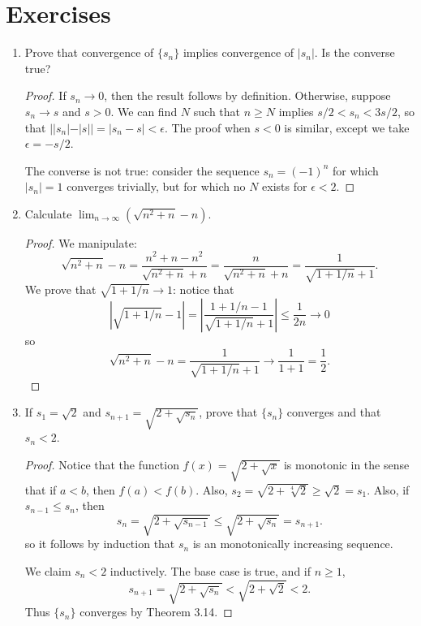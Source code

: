 \documentclass{scrbook}
\renewcommand{\to}{\rightarrow}
\begin{document}
\section{Exercises}

\begin{enumerate}
\item %
Prove that convergence of $\{s_n\}$ implies convergence of $|s_n|$. Is the converse true?

\begin{proof}
If $s_n \to 0$, then the result follows by definition. Otherwise, suppose $s_n \to s$ and $s > 0$. We can find $N$ such that $n \ge N$ implies $s/2 < s_n < 3s/2$, so that $||s_n| - |s|| = |s_n - s| < \epsilon$. The proof when $s < 0$ is similar, except we take $\epsilon = -s/2$.

The converse is not true: consider the sequence $s_n = (-1)^{n}$ for which $|s_n| = 1$ converges trivially, but for which no $N$ exists for $\epsilon < 2$.
\end{proof}

\item %
Calculate $\lim_{n \to \infty} (\sqrt{n^2 + n} - n)$.

\begin{proof}
We manipulate:
\[
	\sqrt{n^2 + n} - n = \frac{n^2 + n - n^2}{\sqrt{n^2 + n} + n} = \frac{n}{\sqrt{n^2 + n} + n} = \frac{1}{\sqrt{1 + 1/n} + 1}.
\]
We prove that $\sqrt{1+1/n} \to 1$: notice that
\[
	|\sqrt{1+1/n} - 1| = \left| \frac{1 + 1/n - 1}{\sqrt{1 + 1/n} + 1} \right| \le \frac{1}{2n} \to 0
\]
so 
\[
	\sqrt{n^2 + n} - n = \frac{1}{\sqrt{1 + 1/n} + 1} \to \frac{1}{1 + 1} = \frac{1}{2}.
\]
\end{proof}

\item %
If $s_1 = \sqrt{2}$ and $s_{n+1} = \sqrt{2 + \sqrt{s_n}}$, prove that $\{s_n\}$ converges and that $s_n < 2$.

\begin{proof}
Notice that the function $f(x) = \sqrt{2 + \sqrt{x}}$ is monotonic in the sense that if $a < b$, then $f(a) < f(b)$. Also, $s_2 = \sqrt{2 + \sqrt[4]{2}} \ge \sqrt{2} = s_1$. Also, if $s_{n-1} \le s_n$, then
\[
	s_n = \sqrt{2 + \sqrt{s_{n-1}}} \le \sqrt{2 + \sqrt{s_n}} = s_{n+1}.
\]
so it follows by induction that $s_n$ is an monotonically increasing sequence. 

We claim $s_n < 2$ inductively. The base case is true, and if $n \ge 1$,
\[
	s_{n+1} = \sqrt{2 + \sqrt{s_n}} < \sqrt{2 + \sqrt{2}} < 2.
\]
Thus $\{s_n\}$ converges by Theorem 3.14.
\end{proof}


\end{enumerate}
\end{document}
